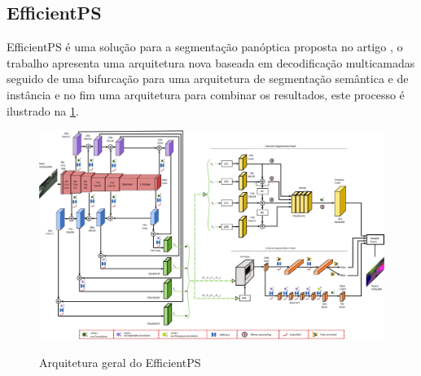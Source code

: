 \subsection{EfficientPS}

EfficientPS é uma solução para a segmentação panóptica proposta no artigo , o trabalho apresenta uma arquitetura nova baseada em decodificação multicamadas seguido  de uma bifurcação para uma arquitetura de segmentação semântica e de instância e no fim uma arquitetura para combinar os resultados, este processo é ilustrado na \cref{fig:arqEP}.

\begin{figure}[H]
	\caption{Arquitetura geral do EfficientPS}
	\centering %
	\includegraphics[width=15cm]{figures/arqEP.jpg} %
	\label{fig:arqEP}
\end{figure}